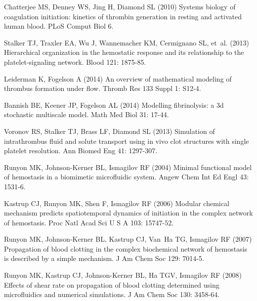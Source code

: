 \documentclass[processes,article,received,moreauthors,pdftex,12pt,a4paper]{mdpi}
\begin{document}
\begin{thebibliography}{9999}
Chatterjee MS, Denney WS, Jing H, Diamond SL (2010) Systems biology of
  coagulation initiation: kinetics of thrombin generation in resting and
  activated human blood.
\newblock PLoS Comput Biol 6.

Stalker TJ, Traxler EA, Wu J, Wannemacher KM, Cermignano SL, et~al. (2013)
  Hierarchical organization in the hemostatic response and its relationship to
  the platelet-signaling network.
\newblock Blood 121: 1875-85.

Leiderman K, Fogelson A (2014) An overview of mathematical modeling of thrombus
  formation under flow.
\newblock Thromb Res 133 Suppl 1: S12-4.

Bannish BE, Keener JP, Fogelson AL (2014) Modelling fibrinolysis: a 3d
  stochastic multiscale model.
\newblock Math Med Biol 31: 17-44.

Voronov RS, Stalker TJ, Brass LF, Diamond SL (2013) Simulation of intrathrombus
  fluid and solute transport using in vivo clot structures with single platelet
  resolution.
\newblock Ann Biomed Eng 41: 1297-307.

Runyon MK, Johnson-Kerner BL, Ismagilov RF (2004) Minimal functional model of
  hemostasis in a biomimetic microfluidic system.
\newblock Angew Chem Int Ed Engl 43: 1531-6.

Kastrup CJ, Runyon MK, Shen F, Ismagilov RF (2006) Modular chemical mechanism
  predicts spatiotemporal dynamics of initiation in the complex network of
  hemostasis.
\newblock Proc Natl Acad Sci U S A 103: 15747-52.

Runyon MK, Johnson-Kerner BL, Kastrup CJ, Van~Ha TG, Ismagilov RF (2007)
  Propagation of blood clotting in the complex biochemical network of
  hemostasis is described by a simple mechanism.
\newblock J Am Chem Soc 129: 7014-5.

Runyon MK, Kastrup CJ, Johnson-Kerner BL, Ha TGV, Ismagilov RF (2008) Effects
  of shear rate on propagation of blood clotting determined using microfluidics
  and numerical simulations.
\newblock J Am Chem Soc 130: 3458-64.


\end{thebibliography}
\end{document}
